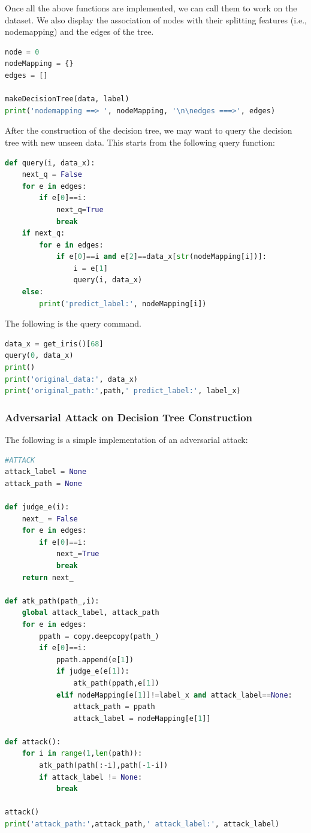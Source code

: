 Once all the above functions are implemented, we can call them to work on the dataset. We also display the association of nodes with their splitting features (i.e., nodemapping) and the edges of the tree. 

\begin{lstlisting}[language=Python]
node = 0
nodeMapping = {}
edges = []

makeDecisionTree(data, label)
print('nodemapping ==> ', nodeMapping, '\n\nedges ===>', edges)
\end{lstlisting}

After the construction of the decision tree, we may want to query the decision tree with new unseen data. This starts from the following query function: 

\begin{lstlisting}[language=Python]
def query(i, data_x):
    next_q = False
    for e in edges:
        if e[0]==i:
            next_q=True
            break
    if next_q:
        for e in edges:
            if e[0]==i and e[2]==data_x[str(nodeMapping[i])]:
                i = e[1]
                query(i, data_x)    
    else:
        print('predict_label:', nodeMapping[i])
\end{lstlisting}

The following is the query command. 

\begin{lstlisting}[language=Python]
data_x = get_iris()[68]
query(0, data_x)
print()
print('original_data:', data_x)
print('original_path:',path,' predict_label:', label_x)
\end{lstlisting}

\subsubsection{Adversarial Attack on Decision Tree Construction}


The following is a simple implementation of an adversarial attack: 
\begin{lstlisting}[language=Python]
#ATTACK
attack_label = None
attack_path = None

def judge_e(i):
    next_ = False
    for e in edges:
        if e[0]==i:
            next_=True
            break
    return next_
    
def atk_path(path_,i):
    global attack_label, attack_path
    for e in edges:
        ppath = copy.deepcopy(path_)
        if e[0]==i:
            ppath.append(e[1])
            if judge_e(e[1]):
                atk_path(ppath,e[1])
            elif nodeMapping[e[1]]!=label_x and attack_label==None:
                attack_path = ppath
                attack_label = nodeMapping[e[1]]
            
def attack():
    for i in range(1,len(path)):
        atk_path(path[:-i],path[-1-i])
        if attack_label != None:
            break
            
attack()
print('attack_path:',attack_path,' attack_label:', attack_label)
\end{lstlisting}